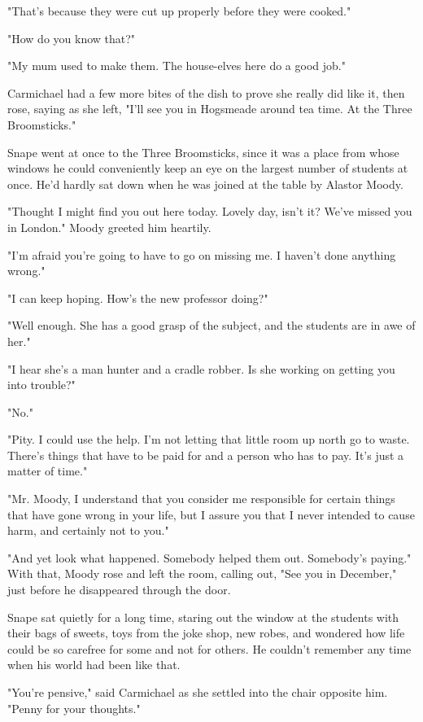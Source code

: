 \documentclass[a4paper,11pt]{article}
\begin{document}
"That's because they were cut up properly before they were cooked."

"How do you know that?"

"My mum used to make them. The house-elves here do a good job."

Carmichael had a few more bites of the dish to prove she really did like it, then rose, saying as she left, "I'll see you in Hogsmeade around tea time. At the Three Broomsticks."

Snape went at once to the Three Broomsticks, since it was a place from whose windows he could conveniently keep an eye on the largest number of students at once. He'd hardly sat down when he was joined at the table by Alastor Moody.

"Thought I might find you out here today. Lovely day, isn't it? We've missed you in London." Moody greeted him heartily.

"I'm afraid you're going to have to go on missing me. I haven't done anything wrong."

"I can keep hoping. How's the new professor doing?"

"Well enough. She has a good grasp of the subject, and the students are in awe of her."

"I hear she's a man hunter and a cradle robber. Is she working on getting you into trouble?"

"No."

"Pity. I could use the help. I'm not letting that little room up north go to waste. There's things that have to be paid for and a person who has to pay. It's just a matter of time."

"Mr. Moody, I understand that you consider me responsible for certain things that have gone wrong in your life, but I assure you that I never intended to cause harm, and certainly not to you."

"And yet look what happened. Somebody helped them out. Somebody's paying." With that, Moody rose and left the room, calling out, "See you in December," just before he disappeared through the door.

Snape sat quietly for a long time, staring out the window at the students with their bags of sweets, toys from the joke shop, new robes, and wondered how life could be so carefree for some and not for others. He couldn't remember any time when his world had been like that.

"You're pensive," said Carmichael as she settled into the chair opposite him. "Penny for your thoughts."
\end{document}
